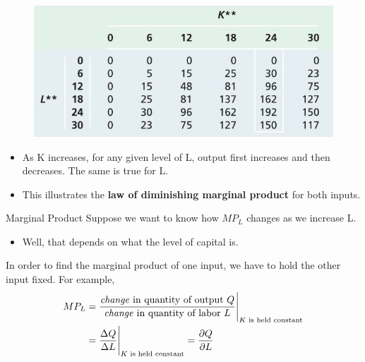 \documentclass[11pt,t]{beamer}
\begin{document}
\begin{frame}
  \begin{center}\begin{figure}
    \includegraphics[width=0.9\linewidth]{figures/table6_3.jpg}
  \end{figure}\end{center}

  \begin{itemize}
    \item As K increases, for any given level of L, output first increases and then decreases. \pause The same is true for L.

    \item This illustrates the \textbf{law of diminishing marginal product} for both inputs.
  \end{itemize}

  
\end{frame}

\begin{frame}{Marginal Product}
  Suppose we want to know how $MP_L$ changes as we increase L.
  
  \bigskip
  \begin{itemize}
    \item Well, that depends on what the level of capital is. 

  \end{itemize}

  \pause\bigskip
  In order to find the marginal product of one input, we have to hold the other input fixed. For example,
  \begin{align*}
    MP_L & =\frac{\text{\textit{change} in quantity of output }Q}{\text{\textit{change} in quantity of labor }L} \Biggr\vert_{K \text{ is held constant}} \\
    & =\frac{\Delta Q}{\Delta L}\Biggr\vert_{K \text{ is held constant}} = \frac{\partial Q}{\partial L}
  \end{align*}
\end{frame}
\end{document}
